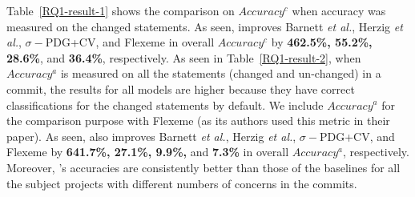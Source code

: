 

Table~\ref{RQ1-result-1} shows the comparison on $Accuracy^{c}$ when
accuracy was measured on the changed statements. As seen, {\tool}
improves Barnett {\em et al.}, Herzig {\em et al.}, $\sigma-$PDG+CV,
and Flexeme in overall $Accuracy^c$ by {\bf 462.5\%, 55.2\%, 28.6\%},
and {\bf 36.4\%}, respectively. As seen in Table~\ref{RQ1-result-2},
when $Accuracy^{a}$ is measured on all the statements (changed and
un-changed) in a commit, the results for all models are higher because
they have correct classifications for the changed statements by
default. We include $Accuracy^{a}$ for the comparison purpose with
Flexeme (as its authors used this metric in their paper). As seen,
{\tool} also improves Barnett {\em et al.}, Herzig {\em et al.},
$\sigma-$PDG+CV, and Flexeme by {\bf 641.7\%, 27.1\%, 9.9\%,} and {\bf
  7.3\%} in overall $Accuracy^{a}$, respectively. Moreover, {\tool}'s
accuracies are consistently better than those of the baselines for all
the subject projects with different numbers of concerns in the
commits.

{\color{red}{why some data points are not available?}}



